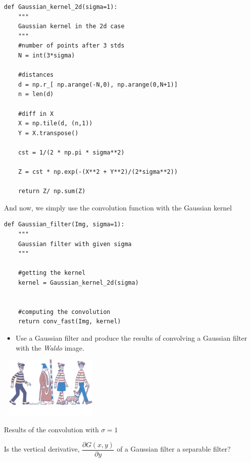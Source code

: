 \documentclass[a4paper]{tufte-handout}
\begin{document}
\begin{center}

 
  \begin{verbatim}
def Gaussian_kernel_2d(sigma=1):
    """
    Gaussian kernel in the 2d case
    """
    #number of points after 3 stds
    N = int(3*sigma)

    #distances
    d = np.r_[ np.arange(-N,0), np.arange(0,N+1)]
    n = len(d)

    #diff in X
    X = np.tile(d, (n,1))
    Y = X.transpose()

    cst = 1/(2 * np.pi * sigma**2)

    Z = cst * np.exp(-(X**2 + Y**2)/(2*sigma**2))

    return Z/ np.sum(Z)

  \end{verbatim}
\end{center}

And now, we simply use the convolution function with the Gaussian kernel

  \begin{verbatim}
def Gaussian_filter(Img, sigma=1):
    """
    Gaussian filter with given sigma
    """

    #getting the kernel
    kernel = Gaussian_kernel_2d(sigma)


    #computing the convolution
    return conv_fast(Img, kernel)
  \end{verbatim}
  \begin{itemize}
\item Use a Gaussian filter and produce the results of convolving a Gaussian
  filter with the \emph{Waldo} image.
\end{itemize}

  \begin{marginfigure}
    \centering
    \includegraphics[width=5cm, height=3cm]{./waldo_gauss_c.png}
    \caption{Results of the convolution with $\sigma=1$}
  \end{marginfigure}
Is the vertical derivative, $\dfrac{\partial G(x,y)}{\partial y}$ of a Gaussian filter a separable filter?
\end{document}
